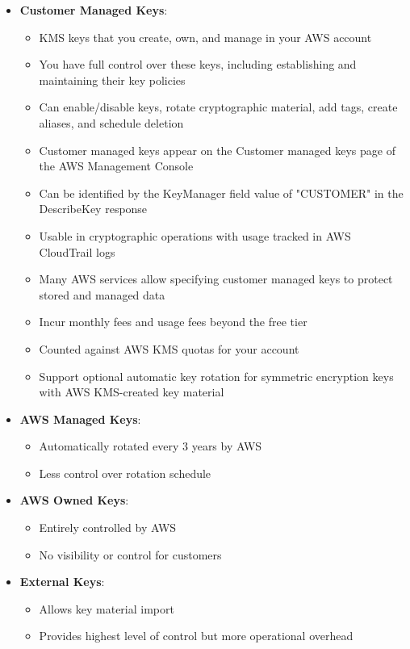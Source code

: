 \documentclass[11pt,a4paper]{report}
\begin{document}
\begin{itemize}
  \item \textbf{Customer Managed Keys}:
\begin{itemize}
  \item KMS keys that you create, own, and manage in your AWS account
  \item You have full control over these keys, including establishing and maintaining their key policies
  \item Can enable/disable keys, rotate cryptographic material, add tags, create aliases, and schedule deletion
  \item Customer managed keys appear on the Customer managed keys page of the AWS Management Console
  \item Can be identified by the KeyManager field value of "CUSTOMER" in the DescribeKey response
  \item Usable in cryptographic operations with usage tracked in AWS CloudTrail logs
  \item Many AWS services allow specifying customer managed keys to protect stored and managed data
  \item Incur monthly fees and usage fees beyond the free tier
  \item Counted against AWS KMS quotas for your account
  \item Support optional automatic key rotation for symmetric encryption keys with AWS KMS-created key material
\end{itemize}
  \item \textbf{AWS Managed Keys}:
\begin{itemize}
  \item Automatically rotated every 3 years by AWS
  \item Less control over rotation schedule
\end{itemize}
  \item \textbf{AWS Owned Keys}:
\begin{itemize}
  \item Entirely controlled by AWS
  \item No visibility or control for customers
\end{itemize}
  \item \textbf{External Keys}:
\begin{itemize}
  \item Allows key material import
  \item Provides highest level of control but more operational overhead
\end{itemize}

\end{itemize}
\end{document}

